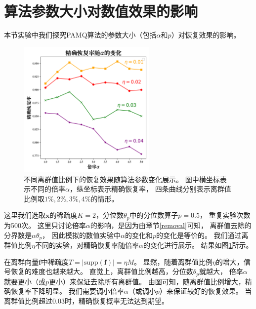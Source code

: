 \documentclass[AutoFakeBold]{LZUThesis}
\begin{document}

\section{算法参数大小对数值效果的影响}

\label{diff_params}
本节实验中我们探究PAMQ算法的参数大小（包括$\alpha$和$p$）对恢复效果的影响。

\begin{figure}[H]
    \centering
    \includegraphics[width=0.6\textwidth]{figures/diff_alpha.png}
    \caption{不同离群值比例下的恢复效果随算法参数变化展示。
        图中横坐标表示不同的倍率$\alpha$，纵坐标表示精确恢复率，
        四条曲线分别表示离群值比例取$1\%, 2\%, 3\%, 4\%$的情形。
        }
    \label{fig_diff_alg}
\end{figure}

这里我们选取$\mathbf{x}$的稀疏度$K = 2$，分位数$\theta_p$中的分位数算子$p = 0.5$，
重复实验次数为500次。
这里只讨论倍率$\alpha$的影响，是因为由章节\ref{removal}可知，
离群值去除的分界数是$\alpha \theta_p$，
因此模拟的数值实验中$\alpha$的变化和$p$的变化是等价的。
我们通过离群值比例$\eta$不同的实验，对精确恢复率随倍率$\alpha$的变化进行展示。
结果如图\ref{fig_diff_alg}所示。

在离群向量$\mathbf{f}$中稀疏度$T = \left | \mathrm{supp} (\mathbf{f}) \right | = \eta M$。
显然，随着离群值比例$\eta$的增大，信号恢复的难度也越来越大。
直觉上，离群值比例越高，分位数$\theta_p$就越大，
倍率$\alpha$就要更小（或$p$更小）来保证去除所有离群值。
由图可知，随离群值比例增大，精确恢复率下降明显。
我们需要调小倍率$\alpha$（或调小$p$）来保证较好的恢复效果。
当离群值比例超过0.03时，精确恢复概率无法达到期望。
\end{document}
